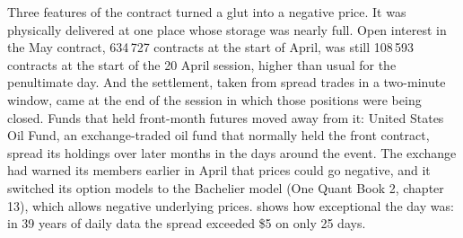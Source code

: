 \begin{omfigure}
\centering
{}

\label{fig:m3:crude-oil:timeline}
\end{omfigure}

Three features of the contract turned a glut into a negative price. It was
physically delivered at one place whose storage was nearly full. Open interest in
the May contract, 634\,727 contracts at the start of April, was still 108\,593
contracts at the start of the 20 April session, higher than usual for the
penultimate day. And the settlement, taken from spread trades in a two-minute
window, came at the end of the session in which those positions were being closed.
Funds that held front-month futures moved away from it: United States Oil Fund,
an exchange-traded oil fund that normally held the front contract, spread its
holdings over later months in the days around the event. The exchange had warned
its members earlier in April that prices could go negative, and it switched its
option models to the Bachelier model (One Quant Book 2, chapter 13), which allows
negative underlying prices.  shows how
exceptional the day was: in 39 years of daily data the spread exceeded \$5 on only
25 days.


